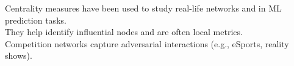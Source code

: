 \documentclass[preview]{standalone}
\begin{document}
Centrality measures have been used to study real-life networks and in ML prediction tasks.\\They help identify influential nodes and are often local metrics.\\Competition networks capture adversarial interactions (e.g., eSports, reality shows).\\
\end{document}

